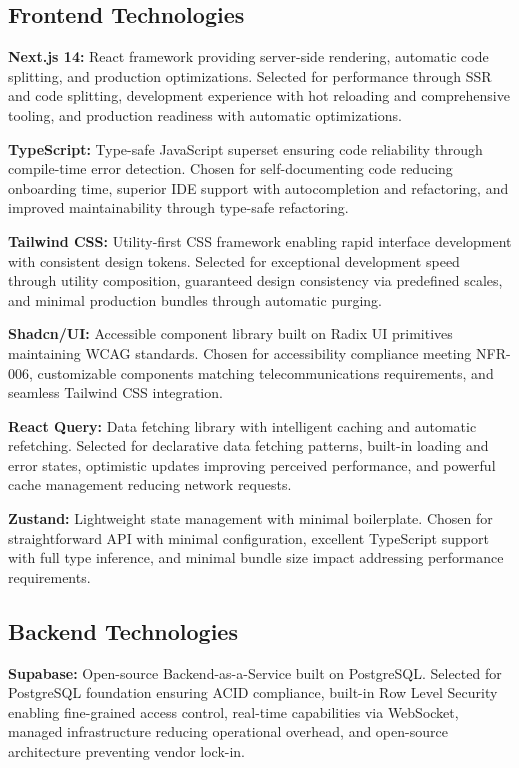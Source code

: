 \subsection{Frontend Technologies}

\textbf{Next.js 14:} React framework providing server-side rendering, automatic code splitting, and production optimizations. Selected for performance through SSR and code splitting, development experience with hot reloading and comprehensive tooling, and production readiness with automatic optimizations.

\textbf{TypeScript:} Type-safe JavaScript superset ensuring code reliability through compile-time error detection. Chosen for self-documenting code reducing onboarding time, superior IDE support with autocompletion and refactoring, and improved maintainability through type-safe refactoring.

\textbf{Tailwind CSS:} Utility-first CSS framework enabling rapid interface development with consistent design tokens. Selected for exceptional development speed through utility composition, guaranteed design consistency via predefined scales, and minimal production bundles through automatic purging.

\textbf{Shadcn/UI:} Accessible component library built on Radix UI primitives maintaining WCAG standards. Chosen for accessibility compliance meeting NFR-006, customizable components matching telecommunications requirements, and seamless Tailwind CSS integration.

\textbf{React Query:} Data fetching library with intelligent caching and automatic refetching. Selected for declarative data fetching patterns, built-in loading and error states, optimistic updates improving perceived performance, and powerful cache management reducing network requests.

\textbf{Zustand:} Lightweight state management with minimal boilerplate. Chosen for straightforward API with minimal configuration, excellent TypeScript support with full type inference, and minimal bundle size impact addressing performance requirements.

\subsection{Backend Technologies}

\textbf{Supabase:} Open-source Backend-as-a-Service built on PostgreSQL. Selected for PostgreSQL foundation ensuring ACID compliance, built-in Row Level Security enabling fine-grained access control, real-time capabilities via WebSocket, managed infrastructure reducing operational overhead, and open-source architecture preventing vendor lock-in.

